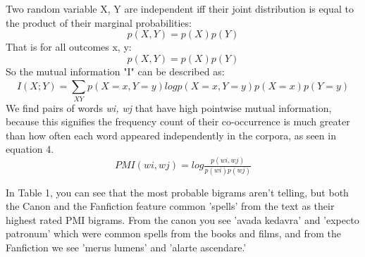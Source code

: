 Two random variable X, Y are independent iff their joint distribution is equal to the product of their marginal probabilities:
\begin{equation}
p( X, Y ) = p( X )p( Y )
\end{equation}
That is for all outcomes x, y:
\begin{equation}
p( X, Y ) = p( X )p( Y )
\end{equation}
So the mutual information "I" can be described as:
\begin{equation}
I(X; Y ) = 
\sum_{XY}^{}
p(X = x, Y = y) log p(X = x, Y = y)
p(X = x)p(Y = y)
\end{equation}
We find pairs of words \textit{wi, wj} that have high pointwise
mutual information, because this signifies the frequency count of their co-occurrence is much greater than how often each word appeared independently in the corpora, as seen in equation 4.  
\begin{equation}
    PMI(wi, wj ) = log\tfrac{p(wi, wj )}{p(wi)p(wj )}
\end{equation}

 In Table 1, you can see that the most probable bigrams aren't telling, but both the Canon and the Fanfiction feature common 'spells' from the text as their highest rated PMI bigrams.  From the canon you see  'avada kedavra' and 'expecto patronum' which were common spells from the books and films, and from the Fanfiction we see 'merus lumens' and 'alarte ascendare.'
 
